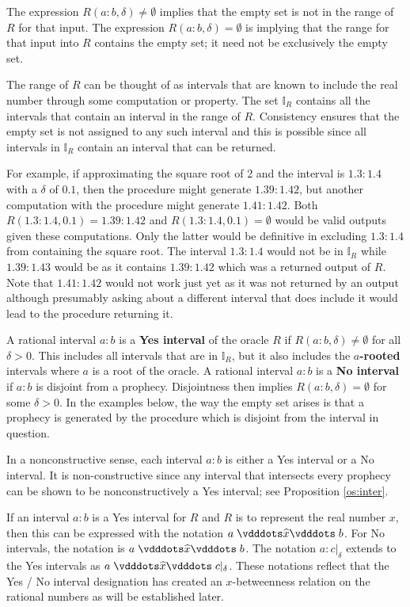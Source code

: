 \documentclass[12pt]{article}
\begin{document}
The expression $R(a:b, \delta) \neq \emptyset$ implies that the empty set is not in the range of $R$ for that input. The expression $R(a:b, \delta) = \emptyset$ is implying that the range for that input into $R$ contains the empty set; it need not be exclusively the empty set.

The range of $R$ can be thought of as intervals that are known to include the real number through some computation or property. The set $\mathbb{I}_R$ contains all the intervals that contain an interval in the range of $R$. Consistency ensures that the empty set is not assigned to any such interval and this is possible since all intervals in $\mathbb{I}_R$ contain an interval that can be returned. 

 For example, if approximating the square root of 2 and the interval is $1.3:1.4$ with a $\delta$ of $0.1$, then the procedure might generate $1.39:1.42$, but another computation with the procedure might generate $1.41:1.42$. Both $R(1.3:1.4, 0.1) = 1.39:1.42$ and $R(1.3:1.4, 0.1) = \emptyset$ would be valid outputs given these computations. Only the latter would be definitive in excluding $1.3:1.4$ from containing the square root. The interval $1.3:1.4$ would not be in $\mathbb{I}_R$ while $1.39:1.43$ would be as it contains $1.39:1.42$ which was a returned output of $R$. Note that $1.41:1.42$ would not work just yet as it was not returned by an output although presumably asking about a different interval that does include it would lead to the procedure returning it. 

A rational interval $a:b$ is a \textbf{Yes interval} of the oracle $R$ if $R(a:b, \delta) \neq \emptyset$ for all $\delta >0$. This includes all intervals that are in  $\mathbb{I}_R$, but it also includes the \textbf{$a$-rooted} intervals where $a$ is a root of the oracle.   A rational interval $a:b$ is a \textbf{No interval} if $a:b$ is disjoint from a prophecy. Disjointness then implies $R(a:b, \delta) = \emptyset$ for some $\delta > 0$. In the examples below, the way the empty set arises is that a prophecy is generated by the procedure which is disjoint from the interval in question. 

In a nonconstructive sense, each interval $a:b$ is either a Yes interval or a No interval. It is non-constructive since any interval that intersects every prophecy can be shown to be nonconstructively a Yes interval; see Proposition \ref{os:inter}. 

If an interval $a:b$ is a Yes interval for $R$ and $R$ is to represent the real number $x$, then this can be expressed with the notation $a \xora b$. For No intervals, the notation is \sout{$a \xora b$}. The notation $a:c|_\delta$ extends to the Yes intervals as $a \xora c|_\delta$. These notations reflect that the Yes / No interval designation has created an $x$-betweenness relation on the rational numbers as will be established later.
\end{document}
